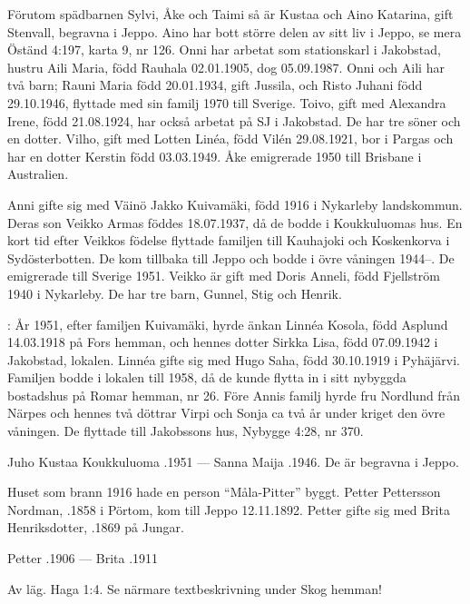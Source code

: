 Förutom spädbarnen Sylvi, Åke och Taimi så är Kustaa och Aino	Katarina, gift Stenvall, begravna i Jeppo. Aino har bott större delen av sitt liv i Jeppo, se mera Öständ 4:197, karta 9, nr 126. Onni har arbetat som 	stationskarl i Jakobstad, hustru Aili Maria, född Rauhala 02.01.1905, dog	05.09.1987. Onni och Aili har två barn; Rauni Maria född 20.01.1934, gift Jussila, och Risto Juhani född 29.10.1946, flyttade med sin familj 1970	till Sverige. Toivo, gift med Alexandra Irene, född 21.08.1924, har också	arbetat på SJ i Jakobstad. De har tre söner och en dotter. Vilho, gift med	Lotten Linéa, född Vilén 29.08.1921, bor i Pargas och har en dotter	Kerstin född 03.03.1949. Åke emigrerade 1950 till Brisbane i Australien.

Anni gifte sig med Väinö Jakko Kuivamäki, född 1916 i Nykarleby landskommun. Deras son Veikko Armas föddes 18.07.1937, då de bodde i Koukkuluomas hus. En kort tid efter Veikkos födelse flyttade familjen till Kauhajoki och Koskenkorva i Sydösterbotten. De kom tillbaka till Jeppo och bodde i övre våningen 1944--. De emigrerade till Sverige 1951. Veikko är gift med Doris Anneli, född Fjellström 1940 i Nykarleby. De har tre barn, Gunnel, Stig och Henrik.

:
År 1951, efter familjen Kuivamäki, hyrde änkan Linnéa Kosola, född Asplund 14.03.1918 på Fors hemman, och hennes dotter Sirkka Lisa, född 07.09.1942 i Jakobstad, lokalen. Linnéa gifte sig med	Hugo Saha, född 30.10.1919 i Pyhäjärvi. Familjen bodde i lokalen till 1958, då de kunde flytta in i sitt nybyggda bostadshus på Romar hemman, nr 26. Före Annis familj hyrde fru Nordlund från Närpes och hennes två döttrar Virpi och Sonja ca två år under kriget den övre våningen. De flyttade till Jakobssons hus, Nybygge 4:28, nr 370.

Juho Kustaa Koukkuluoma .1951  ---  Sanna Maija .1946. De är begravna i Jeppo.

Huset som brann 1916 hade en person ``Måla-Pitter'' byggt. Petter Pettersson Nordman, .1858 i Pörtom, kom till Jeppo 12.11.1892. Petter gifte sig med Brita Henriksdotter, .1869 på Jungar.

Petter .1906  ---  Brita .1911



%

Av läg. Haga 1:4.
Se närmare textbeskrivning under Skog hemman!\jhvspace{}
